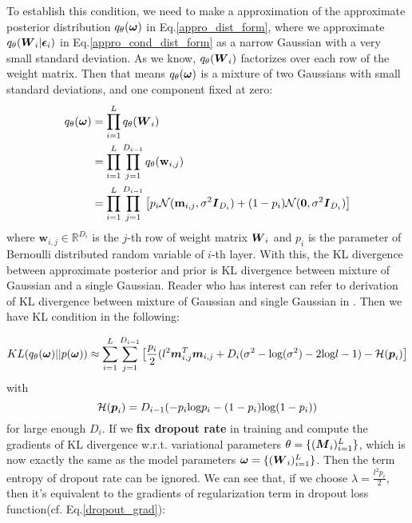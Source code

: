 To establish this condition, we need to make a approximation of the approximate posterior distribution $q_{\theta}(\boldsymbol \omega)$ in Eq.\ref{appro_dist_form}, where we approximate $q_{\theta}(\boldsymbol W_{i}|\boldsymbol \epsilon_{i})$ in Eq.\ref{appro_cond_dist_form} as a narrow Gaussian with a very small standard deviation. As we know, $q_{\theta}(\boldsymbol W_{i})$ factorizes over each row of the weight matrix. Then that means $q_{\theta}(\boldsymbol \omega)$ is a mixture of two Gaussians with small standard deviations, and one component fixed at zero:
\begin{equation}\label{appro_dist_guassian}
\begin{aligned}
q_{\theta}(\boldsymbol \omega) &= \prod_{i=1}^{L}q_{\theta}(\boldsymbol W_{i}) \\
&=\prod_{i=1}^{L}\prod_{j=1}^{D_{i-1}}q_{\theta}(\textbf{w}_{i,j}) \\
&= \prod_{i=1}^{L}\prod_{j=1}^{D_{i-1}} \big[ p_{i} \mathcal N(\textbf{m}_{i,j},\sigma^{2} \boldsymbol I_{D_{i}}) + (1-p_{i})\mathcal N(\boldsymbol 0, \sigma^{2} \boldsymbol I_{D_{i}})\big]
\end{aligned}
\end{equation}
where $\textbf{w}_{i,j} \in \mathbb R^{D_{i}}$ is the $j$-th row of weight matrix $\boldsymbol W_{i}$ and $p_{i}$ is the parameter of Bernoulli distributed random variable of $i$-th layer. With this, the KL divergence between approximate posterior and prior is KL divergence between mixture of Gaussian and a single Gaussian. 
Reader who has interest can refer to derivation of KL divergence between mixture of Gaussian and single Gaussian in \cite{gal2016uncertainty}. Then we have KL condition in the following:

\begin{equation}
\begin{aligned} \label{kl_condition}
KL(q_{\theta}(\boldsymbol \omega) || p(\boldsymbol \omega)) \approx \sum_{i=1}^{L} \sum_{j=1}^{D_{i-1}}
\big[
\frac{p_{i}}{2}(l^{2}\boldsymbol m_{i,j}^{T} \boldsymbol m_{i,j} + D_{i}( \sigma^{2} -\text{log}(\sigma^{2}) -2\text{log} l- 1) - \mathcal H (\boldsymbol p_{i}) 
\big] 
\end{aligned} 
\end{equation}
with 
\[
\mathcal H(\boldsymbol p_{i}) = D_{i-1}(-p_{i}\text{log}p_{i} - (1-p_{i})\text{log}(1-p_{i}))
\]
for large enough $D_{i}$. If we \textbf{fix dropout rate} in training and compute the gradients of KL divergence w.r.t. variational parameters $\theta = \{(\boldsymbol M_{i})_{i=1}^{L} \}$, which is now exactly the same as the model parameters $\boldsymbol \omega = \{(\boldsymbol W_i)_{i=1}^L\}$. Then the term entropy of dropout rate can be ignored.  We can see that, if we choose $\lambda = \frac{l^{2}p_{i}}{2}$, then it's equivalent to the gradients of regularization term in dropout loss function(cf. Eq.\ref{dropout_grad}):


